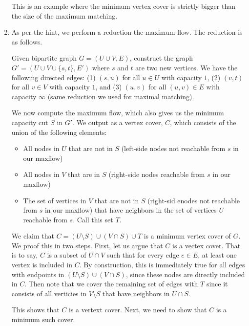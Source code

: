 \documentclass[12pt]{exam}
\begin{document}
\begin{questions}
\begin{solution}
\begin{enumerate}[label=(\alph*)]
      This is an example where the minimum vertex cover is strictly bigger than the size of the maximum matching.

    \item
      As per the hint, we perform a reduction the maximum flow. The reduction is as follows. 

      Given bipartite graph $G = (U \cup V,E)$, construct the graph $G' = (U \cup V \cup \{s,t\}, E')$ where $s$ and $t$ are two new vertices. We have the following directed edges: (1) $(s,u)$ for all $u \in U$ with capacity $1$, (2) $(v, t)$ for all $v \in V$ with capacity $1$, and (3) $(u,v)$ for all $(u,v) \in E$ with capacity $\infty$ (same reduction we used for maximal matching).

      We now compute the maximum flow, which also gives us the minimum capacity cut $S$ in $G'$. We output as a vertex cover, $C$, which consists of the union of the following elements:
      \begin{itemize}
        \item All nodes in $U$ that are not in $S$ (left-side nodes not reachable from $s$ in our maxflow)
        \item All nodes in $V$ that are in $S$ (right-side nodes reachable from $s$ in our maxflow)
        \item The set of vertices in $V$ that are not in $S$ (right-sid enodes not reachable from $s$ in our maxflow) that have neighbors in the set of vertices $U$ reachable from $s$. Call this set $T$.
      \end{itemize}
      We claim that $C = (U \setminus S) \cup (V \cap S) \cup T$ is a minimum vertex cover of $G$. We proof this in two steps. First, let us argue that $C$ is a vectex cover. That is to say, $C$ is a subset of $U \cap V$ such that for every edge $e \in E$, at least one vertex is included in $C$. By construction, this is immediately true for all edges with endpoints in $(U \setminus S) \cup (V \cap S)$, since these nodes are directly included in $C$. Then note that we cover the remaining set of edges with $T$ since it consists of all verticies in $V \setminus S$ that have neighbors in $U \cap S$.

      This shows that $C$ is a vertext cover. Next, we need to show that $C$ is a minimum such cover. 


\end{enumerate}
\end{solution}
\end{questions}
\end{document}
